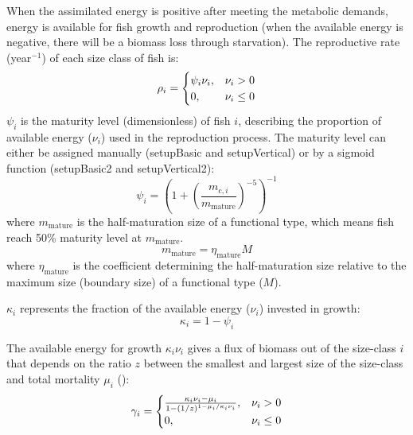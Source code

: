 \documentclass[
]{article}
\begin{document}
When the assimilated energy is positive after meeting the metabolic
demands, energy is available for fish growth and reproduction (when the
available energy is negative, there will be a biomass loss through
starvation). The reproductive rate (year\(^{-1}\)) of each size class of
fish is: \begin{equation}
\rho_i =
  \begin{cases}
 \psi_i \nu_i, & \text{$ \nu_i > 0 $}   \\
     0, & \text{$ \nu_i \leq 0 $} 
  \end{cases}
\end{equation} \(\psi_i\) is the maturity level (dimensionless) of fish
\(i\), describing the proportion of available energy (\(\nu_{i}\)) used
in the reproduction process. The maturity level can either be assigned
manually (setupBasic and setupVertical) or by a sigmoid function
(setupBasic2 and setupVertical2): \begin{equation}
\psi_i = \left(1+\left(\frac{m_{\mathrm{c},i}}{m_{\mathrm{mature}}}\right)^{-5} \right)^{-1}
\end{equation} where \(m_{\mathrm{mature}}\) is the half-maturation size
of a functional type, which means fish reach 50\% maturity level at
\(m_{\mathrm{mature}}\). \begin{equation}
m_{\mathrm{mature}} = \eta_{\mathrm{mature}} M
\end{equation} where \(\eta_{\mathrm{mature}}\) is the coefficient
determining the half-maturation size relative to the maximum size
(boundary size) of a functional type (\(M\)).

\(\kappa_{i}\) represents the fraction of the available energy
(\(\nu_{i}\)) invested in growth: \begin{equation}
\kappa_i = 1 - \psi_i
\end{equation}

The available energy for growth \(\kappa_i \nu_i\) gives a flux of
biomass out of the size-class \(i\) that depends on the ratio \(z\)
between the smallest and largest size of the size-class and total
mortality \(\mu_i\) ():
\begin{equation}
 \gamma_i =
  \begin{cases}
\frac{ \kappa_i \nu_i - \mu_i }{1-(1/z)^{1-\mu_i/\kappa_i \nu_i}}, & \text{$ \nu_i > 0 $}   \\
     0, & \text{$ \nu_i \leq 0 $} 
  \end{cases}
\end{equation}
\end{document}
